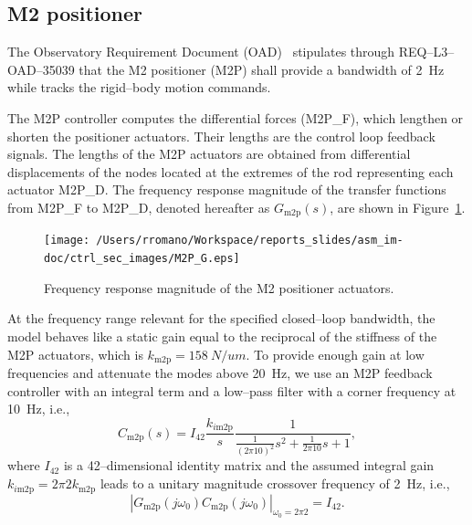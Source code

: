\documentclass{gmto}
\begin{document}
\subsection{M2 positioner}
\label{sec:m2p-ctrl}

The Observatory Requirement Document (OAD)~\cite{OAD} stipulates through REQ--L3--OAD--35039 that the M2 positioner (M2P) shall provide a bandwidth of \SI{2}{Hz} while tracks the rigid--body motion commands.

The M2P controller computes the differential forces (\textsf{M2P\_F}), which lengthen or shorten the positioner actuators. Their lengths are the control loop feedback signals. The lengths of the M2P actuators are obtained from differential displacements of the nodes located at the extremes of the rod representing each actuator \textsf{M2P\_D}. The frequency response magnitude of the transfer functions from \textsf{M2P\_F} to \textsf{M2P\_D}, denoted hereafter as $G_\text{m2p}(s)$, are shown in Figure~\ref{fig:M2P_G}. %
%
\begin{figure}[!hbt]
    \vspace{6pt}
    \centering
    \texttt{[image: /Users/rromano/Workspace/reports\_slides/asm\_im-doc/ctrl\_sec\_images/M2P\_G.eps]}
    \caption{Frequency response magnitude of the M2 positioner actuators.}
    \label{fig:M2P_G}
\end{figure}
%
At the frequency range relevant for the specified closed--loop bandwidth, the model behaves like a static gain equal to the reciprocal of the stiffness of the M2P actuators, which is $k_\text{m2p}=\SI{158}{N/um}$. %
To provide enough gain at low frequencies and attenuate the modes above \SI{20}{Hz}, we use an M2P feedback controller with an integral term and a low--pass filter with a corner frequency at \SI{10}{Hz}, i.e.,
\begin{equation}
\label{eq:C_m2p}
C_\text{m2p}(s) = I_{42} \frac{k_{i\text{m2p}}}{s} \frac{1}{\frac{1}{\left(2\pi10\right)^2}s^2 + \frac{1}{2\pi10}s+1} ,
\end{equation}
where $I_{42}$ is a 42--dimensional identity matrix and the assumed integral gain $k_{i\text{m2p}} = 2 \pi 2 k_\text{m2p}$ leads to a unitary magnitude crossover frequency of \SI{2}{Hz}, i.e., 
\[\left|G_\text{m2p}(j\omega_0)C_\text{m2p}(j\omega_0)\right|_{\omega_0 = 2\pi2} = I_{42} .\]
\end{document}
